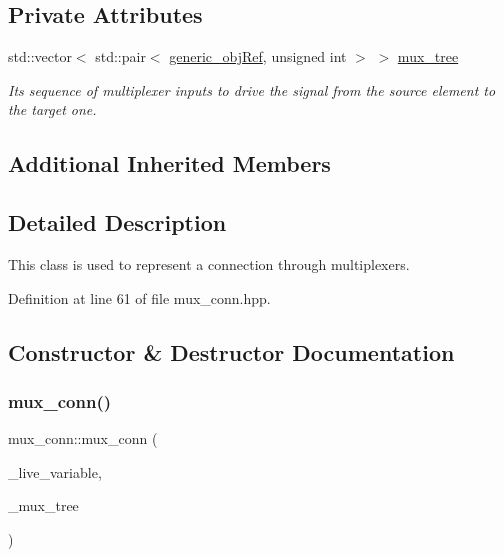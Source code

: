 \subsection*{Private Attributes}
\begin{DoxyCompactItemize}
\item 
std\+::vector$<$ std\+::pair$<$ \hyperlink{generic__obj_8hpp_acb533b2ef8e0fe72e09a04d20904ca81}{generic\+\_\+obj\+Ref}, unsigned int $>$ $>$ \hyperlink{classmux__conn_a189ffae3ce4b9d956f04912c66e07067}{mux\+\_\+tree}
\begin{DoxyCompactList}\small\item\em It\textquotesingle{}s sequence of multiplexer inputs to drive the signal from the source element to the target one. \end{DoxyCompactList}\end{DoxyCompactItemize}
\subsection*{Additional Inherited Members}


\subsection{Detailed Description}
This class is used to represent a connection through multiplexers. 

Definition at line 61 of file mux\+\_\+conn.\+hpp.



\subsection{Constructor \& Destructor Documentation}
\mbox{\label{classmux__conn_a3616b9557bc1ac18705d4843db42cfcd}} 
\subsubsection{\texorpdfstring{mux\+\_\+conn()}{mux\_conn()}}
{\footnotesize\ttfamily mux\+\_\+conn\+::mux\+\_\+conn (\begin{DoxyParamCaption}\item[{const \hyperlink{classCustomOrderedSet}{Custom\+Ordered\+Set}$<$ \hyperlink{conn__binding_8hpp_ae44ffa64566f2bb3ce6941833ac940fb}{data\+\_\+transfer} $>$ \&}]{\+\_\+live\+\_\+variable,  }\item[{std\+::vector$<$ std\+::pair$<$ \hyperlink{generic__obj_8hpp_acb533b2ef8e0fe72e09a04d20904ca81}{generic\+\_\+obj\+Ref}, unsigned int $>$$>$}]{\+\_\+mux\+\_\+tree }\end{DoxyParamCaption})\hspace{0.3cm}{\ttfamily [inline]}}



